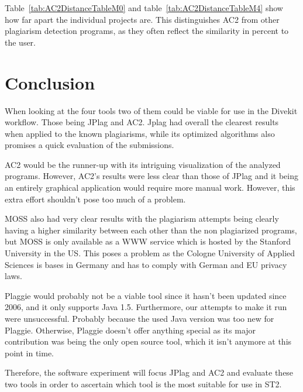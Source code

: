 \documentclass[a4paper, 11pt]{article}
\renewcommand{\\}{\vspace*{0.5\baselineskip} \newline}
\begin{document}
Table~\ref{tab:AC2DistanceTableM0} and table~\ref{tab:AC2DistanceTableM4} show how far apart the individual projects are. This distinguishes AC2 from other plagiarism detection programs, as they often reflect the similarity in percent to the user.

\clearpage


\section{Conclusion}

When looking at the four tools two of them could be viable for use in the Divekit workflow. Those being JPlag and AC2. Jplag had overall the clearest results when applied to the known plagiarisms, while its optimized algorithms also promises a quick evaluation of the submissions.

AC2 would be the runner-up with its intriguing visualization of the analyzed programs. However, AC2's results were less clear than those of JPlag and it being an entirely graphical application would require more manual work. However, this extra effort shouldn't pose too much of a problem.

MOSS also had very clear results with the plagiarism attempts being clearly having a higher similarity between each other than the non plagiarized programs, but MOSS is only available as a WWW service which is hosted by the Stanford University in the US. This poses a problem as the Cologne University of Applied Sciences is bases in Germany and has to comply with German and EU privacy laws.

Plaggie would probably not be a viable tool since it hasn't been updated since 2006, and it only supports Java 1.5. Furthermore, our attempts to make it run were unsuccessful. Probably because the used Java version was too new for Plaggie. Otherwise, Plaggie doesn't offer anything special as its major contribution was being the only open source tool, which it isn't anymore at this point in time.

Therefore, the software experiment will focus JPlag and AC2 and evaluate these two tools in order to ascertain which tool is the most suitable for use in ST2.

\newpage

\printbibliography[
	heading=bibintoc,
	title={References}
]

\appendix
\end{document}
